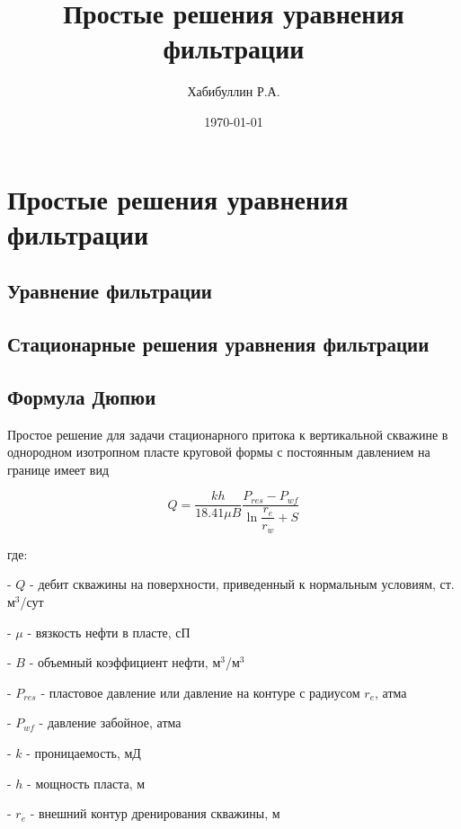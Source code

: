 \documentclass[oneside, openany]{memoir}
\author{Хабибуллин Р.А.}
\title{Простые решения уравнения фильтрации}
\date{\today}
\begin{document}
	
	\maketitle
	
	\chapter{Простые решения уравнения фильтрации}
	
	\section{Уравнение фильтрации}
	
	
	
	
	\section{Стационарные решения уравнения фильтрации}
	
	
	
	
	\section{Формула Дюпюи}
	
	Простое решение для задачи стационарного притока к вертикальной скважине в однородном изотропном пласте круговой формы с постоянным давлением на границе имеет вид
	
	\begin{equation}
		Q=\dfrac{kh}{18.41\mu B} \dfrac{P_{res}-P_{wf}}{\ln \dfrac{r_e}{r_w} + S} 
	\end{equation}
	
	
	где: 
	
	- $Q$ - дебит скважины на поверхности, приведенный к нормальным условиям, ст. м$^3$/сут
	
	- $\mu$ - вязкость нефти в пласте, сП
	
	- $B$ - объемный коэффициент нефти, м$^3$/м$^3$
	
	- $P_{res}$ - пластовое давление или давление на контуре с радиусом $r_e$, атма
	
	- $P_{wf}$ - давление забойное, атма
	
	- $k$ - проницаемость, мД
	
	- $h$ - мощность пласта, м
	
	- $r_e$ - внешний контур дренирования скважины, м
	
\end{document}
